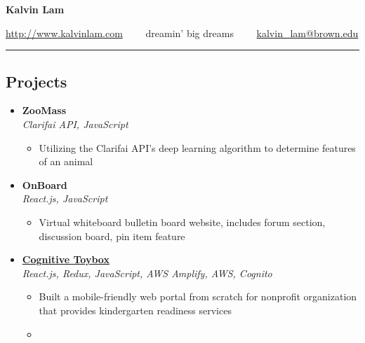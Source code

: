\documentclass[10pt,letterpaper]{article}
\begin{document}
\begin{center}
{\huge \textbf{Kalvin Lam}}


\href{http://www.kalvinlam.com}{http://www.kalvinlam.com}\ \ \textbullet
\ \ dreamin' big dreams\ \ \textbullet
\ \ \href{malto:kalvin_lam@brown.edu}{kalvin\_lam@brown.edu}

\end{center}

\hrule
\vspace{-1.0em}
\subsection*{Projects}
  \begin{itemize}
    \parskip=-0.5em
    \item[]
    {\textbf{ZooMass} \hfill
      \textbf{}}
    \\
    {\emph{Clarifai API, JavaScript} \hfill \emph{}}

    \begin{itemize}[label=\textbullet]
      \itemsep0em
      \item Utilizing the Clarifai API's deep learning algorithm to determine features of an animal
    \end{itemize}
     \item[]
    {\textbf{OnBoard} \hfill
      \textbf{}}
    \\
    {\emph{React.js, JavaScript} \hfill \emph{}}

    \begin{itemize}[label=\textbullet]
      \itemsep0em
      \item Virtual whiteboard bulletin board website, includes forum section,
discussion board, pin item feature
    \end{itemize}
     \item[]
    {\href{http://www.cognitivetoybox.com/}{\textbf{Cognitive Toybox}} \hfill
      \textbf{}}
    \\
    {\emph{React.js, Redux, JavaScript, AWS Amplify, AWS, Cognito} \hfill \emph{}}

    \begin{itemize}[label=\textbullet]
      \itemsep0em
      \item Built a mobile-friendly web portal from scratch for nonprofit organization that provides kindergarten readiness services 
      \item 
    \end{itemize}
    
\end{itemize}
\end{document}
